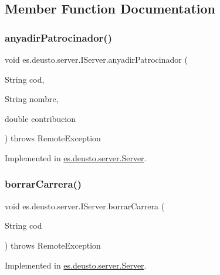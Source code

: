 \subsection{Member Function Documentation}
\mbox{\label{interfacees_1_1deusto_1_1server_1_1_i_server_a50aa44ec5681089479d0793086a748a1}} 
\subsubsection{\texorpdfstring{anyadirPatrocinador()}{anyadirPatrocinador()}}
{\footnotesize\ttfamily void es.\+deusto.\+server.\+I\+Server.\+anyadir\+Patrocinador (\begin{DoxyParamCaption}\item[{String}]{cod,  }\item[{String}]{nombre,  }\item[{double}]{contribucion }\end{DoxyParamCaption}) throws Remote\+Exception}



Implemented in \mbox{\hyperlink{classes_1_1deusto_1_1server_1_1_server_ab38b8a38462608f1537cd7666e8ce0db}{es.\+deusto.\+server.\+Server}}.

\mbox{\label{interfacees_1_1deusto_1_1server_1_1_i_server_aaf52191bb3f870f0fcbdd58ffa7bd9c7}} 
\subsubsection{\texorpdfstring{borrarCarrera()}{borrarCarrera()}}
{\footnotesize\ttfamily void es.\+deusto.\+server.\+I\+Server.\+borrar\+Carrera (\begin{DoxyParamCaption}\item[{String}]{cod }\end{DoxyParamCaption}) throws Remote\+Exception}



Implemented in \mbox{\hyperlink{classes_1_1deusto_1_1server_1_1_server_a0a3160bdb7bfaab43143f1b0e68aee51}{es.\+deusto.\+server.\+Server}}.

